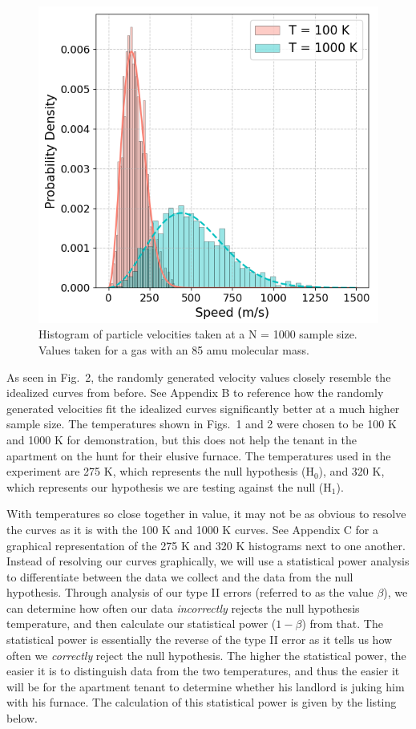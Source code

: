 \documentclass[%
 reprint,
 amsmath,amssymb,
 aps,
]{revtex4-2}
\begin{document}
\begin{figure}[h]
\caption{Histogram of particle velocities taken at a N = 1000 sample size. Values taken for a gas with an 85 amu molecular mass.}
\centering
	\includegraphics[scale=0.51]{code1}
\end{figure}

As seen in Fig.\ 2, the randomly generated velocity values closely resemble the idealized curves from before. See Appendix B to reference how the randomly generated velocities fit the idealized curves significantly better at a much higher sample size. The temperatures shown in Figs.\ 1 and 2 were chosen to be 100 K and 1000 K for demonstration, but this does not help the tenant in the apartment on the hunt for their elusive furnace. The temperatures used in the experiment are 275 K, which represents the null hypothesis (H$_0$), and 320 K, which represents our hypothesis we are testing against the null (H$_1$).

With temperatures so close together in value, it may not be as obvious to resolve the curves as it is with the 100 K and 1000 K curves. See Appendix C for a graphical representation of the 275 K and 320 K histograms next to one another. Instead of resolving our curves graphically, we will use a statistical power analysis to differentiate between the data we collect and the data from the null hypothesis. Through analysis of our type II errors (referred to as the value $\beta$), we can determine how often our data \textit{incorrectly} rejects the null hypothesis temperature, and then calculate our statistical power ($1-\beta$) from that. The statistical power is essentially the reverse of the type II error as it tells us how often we \textit{correctly} reject the null hypothesis. The higher the statistical power, the easier it is to distinguish data from the two temperatures, and thus the easier it will be for the apartment tenant to determine whether his landlord is juking him with his furnace. The calculation of this statistical power is given by the listing below.
\end{document}
